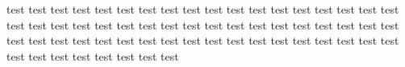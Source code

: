 \documentclass[12pt,a4paper]{article}
\begin{document}
\begin{mybox}
test test test test test test test test test test test test test test test test test test test test test test test test test test test test test test test test test test test test test test test test test test test test test test test test test test test test test test test test test test test test test test 
\end{mybox}
\end{document}
